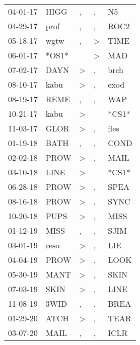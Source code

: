 \begin{supertabular}{lllll}
 04-01-17 &   HIGG &                , &                , &     N5 \\
 04-29-17 &   prof &                , &                , &   ROC2 \\
 05-18-17 &   wgtw &                , &     \textgreater &   TIME \\
 06-01-17 &  *OS1* &                  &     \textgreater &    MAD \\
 07-02-17 &   DAYN &     \textgreater &                , &   brch \\
 08-10-17 &   kabu &     \textgreater &                , &   exod \\
 08-19-17 &   REME &                , &                , &    WAP \\
 10-21-17 &   kabu &     \textgreater &                  &  *CS1* \\
 11-03-17 &   GLOR &     \textgreater &                , &   fles \\
 01-19-18 &   BATH &                , &                , &   COND \\
 02-02-18 &   PROW &     \textgreater &                , &   MAIL \\
 03-10-18 &   LINE &     \textgreater &                  &  *CS1* \\
 06-28-18 &   PROW &     \textgreater &                , &   SPEA \\
 08-16-18 &   PROW &     \textgreater &                , &   SYNC \\
 10-20-18 &   PUPS &     \textgreater &                , &   MISS \\
 01-12-19 &   MISS &                , &                , &   SJIM \\
 03-01-19 &   reso &     \textgreater &                , &    LIE \\
 04-04-19 &   PROW &     \textgreater &                , &   LOOK \\
 05-30-19 &   MANT &     \textgreater &                , &   SKIN \\
 07-03-19 &   SKIN &     \textgreater &                , &   LINE \\
 11-08-19 &   3WID &                , &                , &   BREA \\
 01-29-20 &   ATCH &     \textgreater &                , &   TEAR \\
 03-07-20 &   MAIL &                , &                , &   ICLR \\
\end{supertabular}
